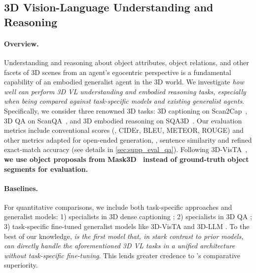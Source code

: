 \documentclass{article}
\begin{document}
\subsection{3D Vision-Language Understanding and Reasoning}\label{sec:exp_3dvl}

\paragraph{Overview.} Understanding and reasoning about object attributes, object relations, and other facets of 3D scenes from an agent's egocentric perspective is a fundamental capability of an embodied generalist agent in the 3D world. We investigate \textit{how well can \agent perform 3D VL understanding and embodied reasoning tasks, especially when being compared against task-specific models and existing generalist agents}. Specifically, we consider three renowned 3D tasks: 3D captioning on Scan2Cap~\citep{chen2021scan2cap}, 3D QA on ScanQA~\citep{azuma2022scanqa}, and 3D embodied reasoning on SQA3D~\citep{ma2023sqa3d}. Our evaluation metrics include conventional scores (\eg, CIDEr, BLEU, METEOR, ROUGE) and other metrics adapted for open-ended generation, \eg, sentence similarity \citep{reimers2019sentence} and refined exact-match accuracy (see details in \cref{sec:supp_eval_qa}).
Following 3D-VisTA~\citep{zhu20233d}, \textbf{we use object proposals from Mask3D~\citep{schult2022mask3d} instead of ground-truth object segments for evaluation.}


\paragraph{Baselines.} For quantitative comparisons, we include both task-specific approaches and generalist models: 1) \sota specialists in 3D dense captioning \citep{chen2021scan2cap,cai20223djcg,chen2023end}; 2) \sota specialists in 3D QA \citep{azuma2022scanqa,ma2023sqa3d}; 3) task-specific fine-tuned generalist models like 3D-VisTA \citep{zhu20233d} and 3D-LLM \citep{hong20233d}. To the best of our knowledge, \textit{\agent is the first model that, in stark contrast to prior models, can directly handle the aforementioned 3D VL tasks in a unified architecture without task-specific fine-tuning}. This lends greater credence to \agent's comparative superiority.




    

    
    
    
    
\end{document}
